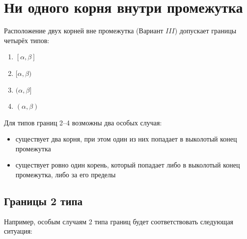 \section {Ни одного корня внутри промежутка}

Расположение двух корней вне промежутка (Вариант $III$) допускает границы четырёх типов:

\begin {enumerate} [labelindent=\parindent, leftmargin=*]
    \item {$[\alpha, \beta]$}
    \item {$[\alpha, \beta)$}
    \item {$(\alpha, \beta]$}
    \item {$(\alpha, \beta)$}
\end {enumerate}

Для типов границ 2--4 возможны два особых случая: 

\begin {itemize}
    \item {существует два корня, при этом один из них попадает в выколотый конец промежутка}
    \item {существует ровно один корень, который попадает либо в выколотый конец промежутка, либо 
     за его пределы }
\end {itemize}

\subsection {Границы 2 типа}

Например, особым случаям 2 типа границ будет соответствовать следующая ситуация:

